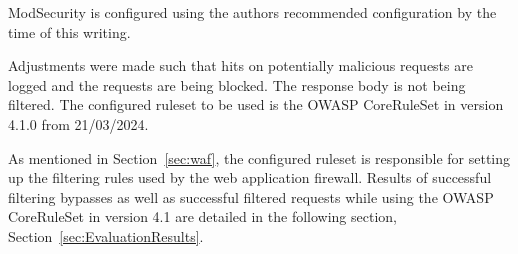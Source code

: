 ModSecurity is configured using the authors recommended configuration by the time of this writing. \cite{modsec/recconf}

Adjustments were made such that hits on potentially malicious requests are logged and the requests are being blocked. The response body is not being filtered.
The configured ruleset to be used is the OWASP CoreRuleSet in version 4.1.0 from 21/03/2024. \cite{crs/410dl}

As mentioned in Section~\ref{sec:waf}, the configured ruleset is responsible for setting up the filtering rules used by the web application firewall. Results of successful filtering bypasses as well as successful filtered requests while using the OWASP CoreRuleSet in version 4.1 are detailed in the following section, Section~\ref{sec:EvaluationResults}.
